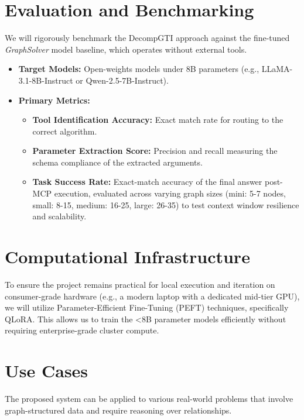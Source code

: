 \documentclass[sigconf, nonacm]{acmart}
\begin{document}
\section{Evaluation and Benchmarking}
We will rigorously benchmark the DecompGTI approach against the fine-tuned \textit{GraphSolver} model baseline, which operates without external tools.
\begin{itemize}
    \item \textbf{Target Models:} Open-weights models under 8B parameters (e.g., LLaMA-3.1-8B-Instruct or Qwen-2.5-7B-Instruct).
    \item \textbf{Primary Metrics:}
    \begin{itemize}
        \item \textbf{Tool Identification Accuracy:} Exact match rate for routing to the correct algorithm.
        \item \textbf{Parameter Extraction Score:} Precision and recall measuring the schema compliance of the extracted arguments.
        \item \textbf{Task Success Rate:} Exact-match accuracy of the final answer post-MCP execution, evaluated across varying graph sizes (mini: 5-7 nodes, small: 8-15, medium: 16-25, large: 26-35) to test context window resilience and scalability.
    \end{itemize}
\end{itemize}

\section{Computational Infrastructure}
To ensure the project remains practical for local execution and iteration on consumer-grade hardware (e.g., a modern laptop with a dedicated mid-tier GPU), we will utilize Parameter-Efficient Fine-Tuning (PEFT) techniques, specifically QLoRA. This allows us to train the <8B parameter models efficiently without requiring enterprise-grade cluster compute.

\section{Use Cases}
The proposed system can be applied to various real-world problems that involve graph-structured data and require reasoning over relationships.
\end{document}
